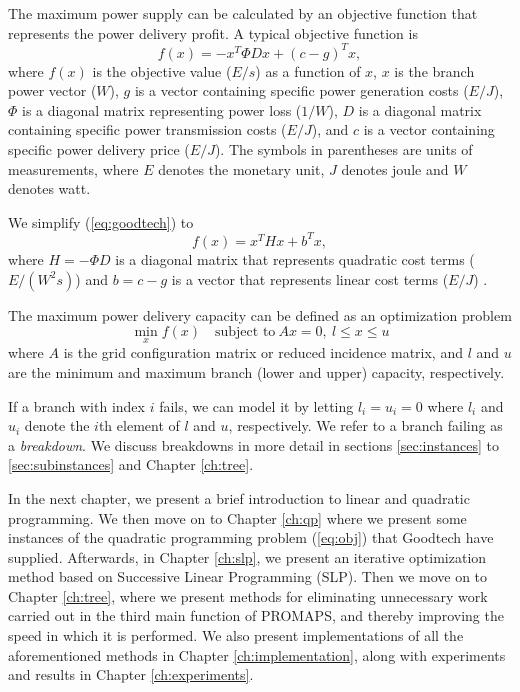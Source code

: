\documentclass[a4paper,12pt]{report}
\begin{document}
The maximum power
supply can be calculated by an objective function that represents the power
delivery profit. A typical objective function is
\begin{equation}
f(x) = - x^T \Phi D x + (c-g)^T x, \label{eq:goodtech}
\end{equation}
where $f(x)$ is the objective value ($E/s$) as a function of $x$, $x$ is the
branch power vector ($W$), $g$ is a vector containing specific power
generation costs ($E/J$), $\Phi$ is a diagonal matrix representing power loss
($1/W$), $D$ is a diagonal matrix containing specific power transmission costs
($E/J$), and $c$ is a vector containing specific power delivery price
($E/J$). The symbols in parentheses are units of measurements, where $E$
denotes the monetary unit, $J$ denotes joule and $W$ denotes
watt\cite{digernes}.

We simplify (\ref{eq:goodtech}) to
\begin{equation}
    f(x) = x^T H x + b^T x, \label{eq:obj}
\end{equation}
where $H = - \Phi D$ is a diagonal matrix that represents quadratic cost terms
($E/(W^2 s)$) and $b = c - g$ is a vector that represents linear cost terms
($E/J$) \cite{digernes}.

The maximum power delivery capacity can be defined as an optimization problem
\begin{equation}
   \min_{x} f(x)\quad\textrm{subject to}~Ax = 0,
                             ~l \leq x \leq u \label{eq:thesisqp}
\end{equation}
where $A$ is the grid configuration matrix or reduced incidence matrix, and
$l$ and $u$ are the minimum and maximum branch (lower and upper) capacity,
respectively\cite{digernes}.

If a branch with index $i$ fails, we can model it by letting
$l_i = u_i = 0$ where $l_i$ and $u_i$ denote the $i$th element of $l$ and
$u$, respectively. We refer to a branch failing as a \textit{breakdown}.
We discuss breakdowns in more detail in sections \ref{sec:instances} to
\ref{sec:subinstances} and Chapter \ref{ch:tree}.

In the next chapter, we present a brief introduction to linear and quadratic
programming.
We then move on to Chapter \ref{ch:qp} where we present some instances of the
quadratic programming problem (\ref{eq:obj}) that Goodtech have supplied.
Afterwards, in Chapter \ref{ch:slp}, we present
an iterative optimization method based on Successive Linear Programming (SLP).
Then we move on to Chapter \ref{ch:tree}, where we present methods for
eliminating unnecessary work carried out in the third main function of PROMAPS,
and thereby improving the speed in which it is performed.
We also present implementations of all the aforementioned methods in Chapter
\ref{ch:implementation}, along with
experiments and results in Chapter \ref{ch:experiments}.
\end{document}
